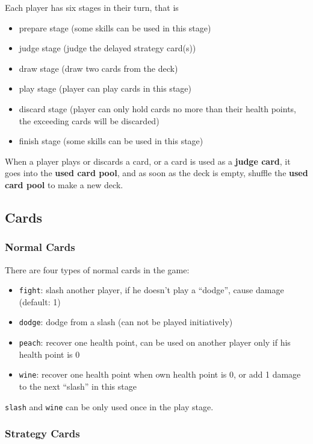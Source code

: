 \documentclass[11pt,a4paper]{article}
\begin{document}
Each player has six stages in their turn, that is
\begin{itemize}
\item prepare stage (some skills can be used in this stage)
\item judge stage (judge the delayed strategy card(s))
\item draw stage (draw two cards from the deck)
\item play stage (player can play cards in this stage)
\item discard stage (player can only hold cards no more than their health points, the exceeding cards will be discarded)
\item finish stage (some skills can be used in this stage)
\end{itemize}

When a player plays or discards a card, or a card is used as a \textbf{judge card}, it goes into the \textbf{used card pool}, and as soon as the deck is empty, shuffle the \textbf{used card pool} to make a new deck. \bigskip

\subsection{Cards}

\subsubsection{Normal Cards}

There are four types of normal cards in the game:
\begin{itemize}
\item \texttt{fight}: slash another player, if he doesn't play a ``dodge'', cause damage (default: 1)
\item \texttt{dodge}: dodge from a slash (can not be played initiatively)
\item \texttt{peach}: recover one health point, can be used on another player only if his health point is 0
\item \texttt{wine}: recover one health point when own health point is 0, or add 1 damage to the next ``slash'' in this stage
\end{itemize}

\texttt{slash} and \texttt{wine} can be only used once in the play stage.

\subsubsection{Strategy Cards}
\end{document}

